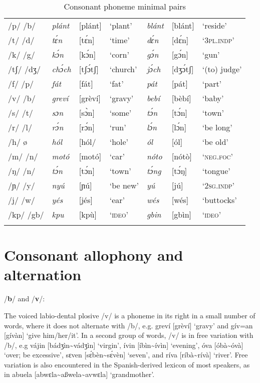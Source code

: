 \begin{table}
\caption{Consonant phoneme minimal pairs}
\label{tab:key:2.2}

\begin{tabularx}{\textwidth}{Qlll@{\qquad\qquad} lll}
\lsptoprule
/p/  /b/ & \itshape plánt & [plánt] & ‘plant’ & \itshape blánt & [blánt] & ‘reside’\\
/t/  /d/ & \itshape tɛ́n & [tɛ́n] & ‘time’ & \itshape dɛ́n & [dɛ́n] & ‘\textsc{3pl.indp}’\\
/k/  /g/ & \itshape kɔ́n & [kɔ́n] & ‘corn’ & \itshape gɔ́n & [gɔ́n] & ‘gun’\\
/tʃ/  /dʒ/ & \itshape chɔ́ch & [tʃɔ́tʃ] & ‘church’ & \itshape jɔ́ch & [dʒɔ́tʃ] & ‘(to) judge’\\
/f/  /p/ & \itshape fát & [fát] & ‘fat’ & \itshape pát & [pát] & ‘part’\\
/v/  /b/ & \itshape greví & [grèví] & ‘gravy’ & \itshape bebí & [bèbí] & ‘baby’\\
/s/  /t/ & \itshape sɔn & [sɔ̀n] & ‘some’ & \itshape tɔ́n & [tɔ́n] & ‘town’\\
/r/  /l/ & \itshape rɔ́n & [rɔ́n] & ‘run’ & \itshape lɔ́n & [lɔ́n] & ‘be long’\\
/h/  ø & \itshape hól & [hól/ & ‘hole’ & \itshape ól & [ól] & ‘be old’\\
/m/  /n/ & \itshape motó & [motó] & ‘car’ & \itshape nóto & [nótò] & ‘\textsc{neg}.\textsc{foc}’\\
/ŋ/  /n/ & \itshape tɔ́n & [tɔ́n] & ‘town’ & \itshape tɔ́ng & [tɔ́ŋ] & ‘tongue’\\
/ɲ/  /y/ & \itshape nyú & [ɲú] & ‘be new’ & \itshape yú & [jú] & ‘\textsc{2sg.indp}’\\
/j/  /w/ & \itshape yés & [jés] & ‘ear’ & \itshape wés & [wés] & ‘buttocks’\\
/kp/ /gb/ & \itshape kpu & [kpù] & ‘\textsc{ideo}’ & \itshape gbin & [gbìn] & ‘\textsc{ideo}’\\
\lspbottomrule
\end{tabularx}
\end{table}
\section{Consonant allophony and alternation}\label{sec:2.2}

/\textbf{b}/ and /\textbf{v}/:

The voiced labio-dental plosive /v/ is a phoneme in its right in a small number of words, where it does not alternate with /b/, e.g. greví [grèví] ‘gravy’ and gív=an [gívàn] ‘give him/her/it’. In a second group of words, /v/ is in free variation with /b/, e.g vájin [bádʒìn{\textasciitilde}vádʒìn] ‘virgin’, ívin [íbìn{\textasciitilde}ívìn] ‘evening’, óva [óbà{\textasciitilde}óvà] ‘over; be excessive’, sɛven [sɛ́bèn{\textasciitilde}sɛ́vèn] ‘seven’, and ríva [ríbà{\textasciitilde}rívà] ‘river’. Free variation is also encountered in the Spanish-derived lexicon of most speakers, as in abuela [abwɛla{\textasciitilde}aßwela{\textasciitilde}avwɛla] ‘grandmother’. 


